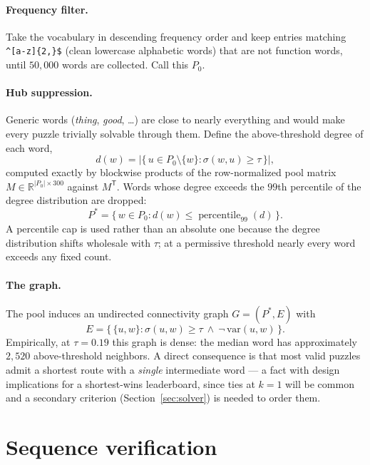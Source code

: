 \documentclass[11pt]{article}
\theoremstyle{definition}
\newcommand{\cosim}{\sigma}
\newcommand{\thresh}{\tau}
\begin{document}
\paragraph{Frequency filter.}
Take the vocabulary in descending frequency order and keep entries matching
\verb|^[a-z]{2,}$| (clean lowercase alphabetic words) that are not function
words, until $50{,}000$ words are collected. Call this $P_0$.

\paragraph{Hub suppression.}
Generic words (\emph{thing}, \emph{good}, \dots) are close to nearly
everything and would make every puzzle trivially solvable through them. Define
the above-threshold degree of each word,
\[
  d(w) = \bigl|\{\, u \in P_0 \setminus \{w\} : \cosim(w, u) \ge \thresh \,\}\bigr|,
\]
computed exactly by blockwise products of the row-normalized pool matrix
$M \in \mathbb{R}^{|P_0| \times 300}$ against $M^{\mathsf T}$. Words whose
degree exceeds the $99$th percentile of the degree distribution are dropped:
\[
  P^\ast = \{\, w \in P_0 : d(w) \le \operatorname{percentile}_{99}(d) \,\}.
\]
A percentile cap is used rather than an absolute one because the degree
distribution shifts wholesale with $\thresh$; at a permissive threshold nearly
every word exceeds any fixed count.

\paragraph{The graph.}
The pool induces an undirected connectivity graph $G = (P^\ast, E)$ with
\[
  E = \bigl\{\, \{u, w\} : \cosim(u, w) \ge \thresh
  \ \wedge\ \neg\,\mathrm{var}(u, w) \,\bigr\}.
\]
Empirically, at $\thresh = 0.19$ this graph is dense: the median word has
approximately $2{,}520$ above-threshold neighbors. A direct consequence is
that most valid puzzles admit a shortest route with a \emph{single}
intermediate word --- a fact with design implications for a shortest-wins
leaderboard, since ties at $k = 1$ will be common and a secondary criterion
(Section~\ref{sec:solver}) is needed to order them.

\section{Sequence verification}
\end{document}
